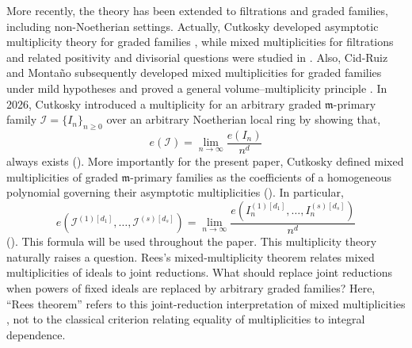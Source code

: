 \documentclass[reqno,12pt]{amsart}
\theoremstyle{plain}
\theoremstyle{definition}
\theoremstyle{remark}
\numberwithin{equation}{section}
\begin{document}
More recently, the theory has been extended to filtrations and graded
families, including non-Noetherian settings. Actually, Cutkosky developed
asymptotic multiplicity theory for graded families
\cite{Cutkosky2013,Cutkosky2014}, while mixed multiplicities for
filtrations and related positivity and divisorial questions were studied
in
\cite{CutkoskySarkarSrinivasan,CutkoskyDivisorial,
CutkoskySrinivasanVerma,CutkoskySarkar2022}.
Also, Cid-Ruiz and Monta\~no subsequently developed mixed multiplicities for
graded families under mild hypotheses and proved a general
volume--multiplicity principle \cite{CidRuizMontano}. In 2026, Cutkosky \cite{Cutkosky2026} introduced a multiplicity for an arbitrary
graded $\mathfrak m$-primary family
$\mathcal I=\{I_n\}_{n\geq0}$ over an arbitrary Noetherian local ring by
showing that, 
\[
e(\mathcal I)
=
\lim_{n\to\infty}\frac{e(I_n)}{n^d}
\]
always exists (\cite[Theorem~1.3]{Cutkosky2026}). More importantly for the present paper, Cutkosky defined mixed
multiplicities of graded $\mathfrak m$-primary families as the
coefficients of a homogeneous polynomial governing their asymptotic
multiplicities (\cite[Theorem~1.6]{Cutkosky2026}). In particular,
\[
e\!\left(
\mathcal I^{(1)[d_1]},\ldots,
\mathcal I^{(s)[d_s]}
\right)
=
\lim_{n\to\infty}
\frac{
e(I_n^{(1)[d_1]},\ldots,I_n^{(s)[d_s]})
}{n^d}
\]
(\cite[Equation~(9)]{Cutkosky2026}). This formula will be used
throughout the paper. This multiplicity theory naturally raises a 
question. Rees's mixed-multiplicity theorem relates mixed
multiplicities of ideals to joint reductions. What should replace joint
reductions when powers of fixed ideals are replaced by arbitrary graded
families? Here, ``Rees theorem'' refers to this joint-reduction
interpretation of mixed multiplicities \cite{Rees1984}, not to the
classical criterion relating equality of multiplicities to integral
dependence.
\end{document}
